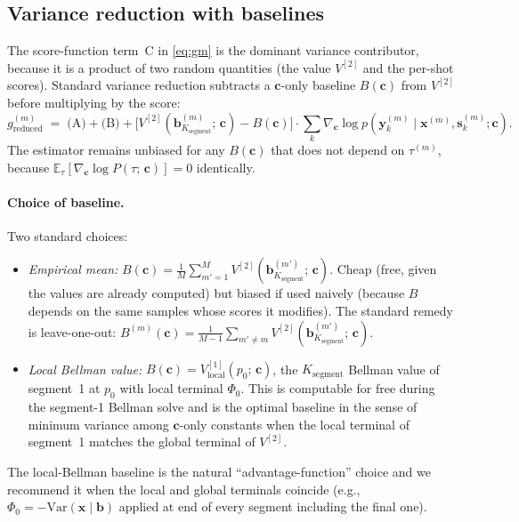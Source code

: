\documentclass[11pt,a4paper]{article}
\newcommand{\bc}{\bm{c}}
\newcommand{\bx}{\bm{x}}
\newcommand{\by}{\bm{y}}
\newcommand{\bs}{\bm{s}}
\newcommand{\bb}{\bm{b}}
\newcommand{\E}{\mathbb{E}}
\begin{document}
\subsection{Variance reduction with baselines}
\label{sec:baseline}

The score-function term~C in \eqref{eq:gm} is the dominant variance contributor, because
it is a product of two random quantities (the value $V^{[2]}$ and the per-shot scores).
Standard variance reduction subtracts a $\bc$-only baseline $B(\bc)$ from $V^{[2]}$ before
multiplying by the score:
\begin{equation}
g^{(m)}_{\mathrm{reduced}}
\;=\;
\text{(A)} + \text{(B)} + \bigl[V^{[2]}(\bb_{K_\mathrm{segment}}^{(m)};\, \bc) - B(\bc)\bigr] \cdot \sum_k \nabla_{\bc} \log p(\by_k^{(m)} \mid \bx^{(m)}, \bs_k^{(m)}; \bc).
\label{eq:gm_baseline}
\end{equation}
The estimator remains unbiased for any $B(\bc)$ that does not depend on $\tau^{(m)}$,
because $\E_{\tau}[\nabla_{\bc} \log P(\tau;\, \bc)] = 0$ identically.

\paragraph{Choice of baseline.}  Two standard choices:
\begin{itemize}[nosep, leftmargin=2em]
\item \emph{Empirical mean:} $B(\bc) = \frac{1}{M} \sum_{m'=1}^M V^{[2]}(\bb_{K_\mathrm{segment}}^{(m')};\, \bc)$.
      Cheap (free, given the values are already computed) but biased if used naively
      (because $B$ depends on the same samples whose scores it modifies).  The standard
      remedy is leave-one-out: $B^{(m)}(\bc) = \frac{1}{M-1} \sum_{m' \ne m} V^{[2]}(\bb_{K_\mathrm{segment}}^{(m')};\, \bc)$.
\item \emph{Local Bellman value:} $B(\bc) = V^{[1]}_{\mathrm{local}}(p_0;\, \bc)$, the
      $K_\mathrm{segment}$ Bellman value of segment~1 at $p_0$ with local terminal $\Phi_0$.
      This is computable for free during the segment-1 Bellman solve and is the optimal
      baseline in the sense of minimum variance among $\bc$-only constants when the local
      terminal of segment~1 matches the global terminal of $V^{[2]}$.
\end{itemize}

The local-Bellman baseline is the natural ``advantage-function'' choice and we recommend
it when the local and global terminals coincide (e.g., $\Phi_0 = -\mathrm{Var}(\bx \mid \bb)$
applied at end of every segment including the final one).
\end{document}
